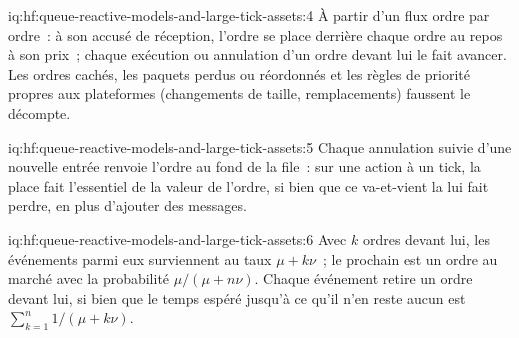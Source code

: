 \begin{solution}{iq:hf:queue-reactive-models-and-large-tick-assets:4}
À partir d'un flux ordre par ordre~: à son accusé de réception, l'ordre se place derrière chaque ordre au repos à son prix~; chaque exécution ou annulation
d'un ordre devant lui le fait avancer. Les ordres cachés, les paquets perdus ou réordonnés et les règles de priorité propres aux plateformes (changements de taille, remplacements) faussent le décompte.
\end{solution}

\begin{solution}{iq:hf:queue-reactive-models-and-large-tick-assets:5}
Chaque annulation suivie d'une nouvelle entrée renvoie l'ordre au fond de la file~: sur une action à un tick, la place fait l'essentiel de la valeur de l'ordre, si bien que ce va-et-vient la
lui fait perdre, en plus d'ajouter des messages.
\end{solution}

\begin{solution}{iq:hf:queue-reactive-models-and-large-tick-assets:6}
Avec $k$ ordres devant lui, les événements parmi eux surviennent au taux $\mu+k\nu$~; le prochain est un ordre au marché avec la probabilité $\mu/(\mu+n\nu)$. Chaque événement retire un
ordre devant lui, si bien que le temps espéré jusqu'à ce qu'il n'en reste aucun est $\sum_{k=1}^n1/(\mu+k\nu)$.
\end{solution}
